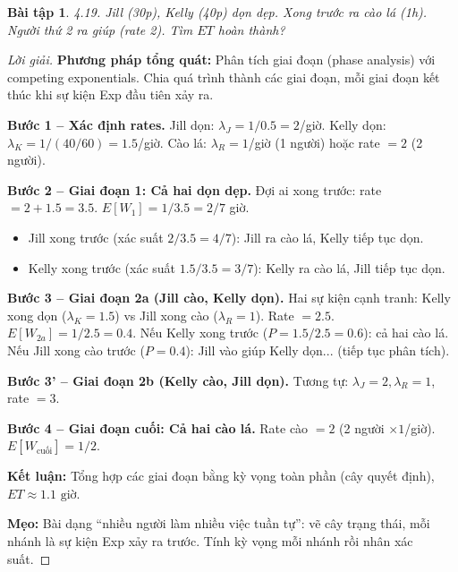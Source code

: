 \documentclass[8pt,a4paper]{article}
\newtheorem{exercise}{Bài tập}
\newenvironment{solution}{\begin{proof}[Lời giải]}{\end{proof}}
\begin{document}
\begin{exercise}
4.19. Jill (30p), Kelly (40p) dọn dẹp. Xong trước ra cào lá (1h). Người thứ 2 ra giúp (rate 2). Tìm $ET$ hoàn thành?
\end{exercise}
\begin{solution}
\textbf{Phương pháp tổng quát:} Phân tích giai đoạn (phase analysis) với competing exponentials. Chia quá trình thành các giai đoạn, mỗi giai đoạn kết thúc khi sự kiện Exp đầu tiên xảy ra.

\textbf{Bước 1 -- Xác định rates.} Jill dọn: $\lambda_J = 1/0.5 = 2$/giờ. Kelly dọn: $\lambda_K = 1/(40/60) = 1.5$/giờ. Cào lá: $\lambda_R = 1$/giờ (1 người) hoặc rate $= 2$ (2 người).

\textbf{Bước 2 -- Giai đoạn 1: Cả hai dọn dẹp.} Đợi ai xong trước: rate $= 2 + 1.5 = 3.5$.
$E[W_1] = 1/3.5 = 2/7$ giờ.
\begin{itemize}[nosep]
\item Jill xong trước (xác suất $2/3.5 = 4/7$): Jill ra cào lá, Kelly tiếp tục dọn.
\item Kelly xong trước (xác suất $1.5/3.5 = 3/7$): Kelly ra cào lá, Jill tiếp tục dọn.
\end{itemize}

\textbf{Bước 3 -- Giai đoạn 2a (Jill cào, Kelly dọn).} Hai sự kiện cạnh tranh: Kelly xong dọn ($\lambda_K = 1.5$) vs Jill xong cào ($\lambda_R = 1$). Rate $= 2.5$.
$E[W_{2a}] = 1/2.5 = 0.4$. Nếu Kelly xong trước ($P = 1.5/2.5 = 0.6$): cả hai cào lá. Nếu Jill xong cào trước ($P = 0.4$): Jill vào giúp Kelly dọn... (tiếp tục phân tích).

\textbf{Bước 3' -- Giai đoạn 2b (Kelly cào, Jill dọn).} Tương tự: $\lambda_J = 2, \lambda_R = 1$, rate $= 3$.

\textbf{Bước 4 -- Giai đoạn cuối: Cả hai cào lá.} Rate cào $= 2$ (2 người $\times 1$/giờ). $E[W_{\text{cuối}}] = 1/2$.

\textbf{Kết luận:} Tổng hợp các giai đoạn bằng kỳ vọng toàn phần (cây quyết định), $\boxed{ET \approx 1.1 \text{ giờ}}$.

\textbf{Mẹo:} Bài dạng ``nhiều người làm nhiều việc tuần tự'': vẽ cây trạng thái, mỗi nhánh là sự kiện Exp xảy ra trước. Tính kỳ vọng mỗi nhánh rồi nhân xác suất.
\end{solution}

\end{document}
